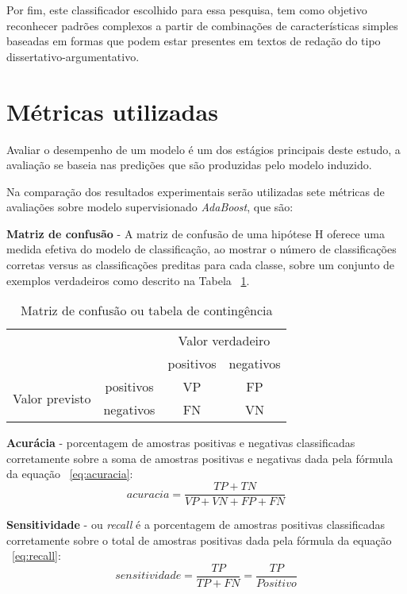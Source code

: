 Por fim, este classificador escolhido para essa pesquisa, tem como objetivo reconhecer padrões complexos a partir de combinações de características simples baseadas em formas que podem estar presentes em textos de redação do tipo dissertativo-argumentativo.

\section{Métricas utilizadas}

Avaliar o desempenho de um modelo é um dos estágios principais deste estudo, a avaliação se baseia nas predições que são produzidas pelo modelo induzido. 

Na comparação dos resultados experimentais serão utilizadas sete métricas de avaliações sobre modelo supervisionado \textit{AdaBoost}, que são:

\textbf{Matriz de confusão} - A matriz de confusão de uma hipótese H oferece uma medida efetiva do modelo de classificação, ao mostrar o número de classificações corretas versus as classificações preditas para cada classe, sobre um conjunto de exemplos verdadeiros como descrito na Tabela ~\ref{tab:sample_matrix_confusion}.

\begin{table}[H]
\centering
\begin{tabular}{rc|c|c|}
\cline{3-4}
\multicolumn{2}{c|}{\multirow{2}{*}{}} & \multicolumn{2}{c|}{Valor verdadeiro} \\ \cline{3-4} 
\multicolumn{2}{c|}{} & positivos & negativos \\ \hline
\multicolumn{1}{|c|}{\multirow{2}{*}{Valor previsto}} & positivos & VP & FP \\ \cline{2-4} 
\multicolumn{1}{|c|}{} & negativos & FN & VN \\ \hline
\end{tabular}
\caption{Matriz de confusão ou tabela de contingência}
\label{tab:sample_matrix_confusion}
\end{table}

\textbf{Acurácia} - porcentagem de amostras positivas e negativas classificadas corretamente sobre a soma de amostras positivas e negativas dada pela fórmula da equação ~\ref{eq:acuracia}:
\begin{equation} \label{eq:acuracia}
 acuracia = \frac{TP+TN}{VP+VN+FP+FN}
\end{equation}

\textbf{Sensitividade} - ou \textit{recall} é a porcentagem de amostras positivas classificadas corretamente sobre o total de amostras positivas dada pela fórmula da equação ~\ref{eq:recall}:
\begin{equation} \label{eq:recall}
  sensitividade = \frac{TP}{TP+FN} = \frac{TP}{Positivo}
\end{equation}

